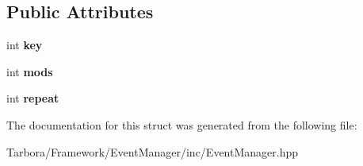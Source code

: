 \subsection*{Public Attributes}
\begin{DoxyCompactItemize}
\item 
\mbox{\label{structTarbora_1_1KeyPressEvent_a3cd905ede11abd9e8e3f0ab2aa06c334}} 
int {\bfseries key}
\item 
\mbox{\label{structTarbora_1_1KeyPressEvent_a62b84a96fe52053278f029ffb4720937}} 
int {\bfseries mods}
\item 
\mbox{\label{structTarbora_1_1KeyPressEvent_ad7887d04cbc6177e0f895dfb33d3dff1}} 
int {\bfseries repeat}
\end{DoxyCompactItemize}


The documentation for this struct was generated from the following file\+:\begin{DoxyCompactItemize}
\item 
Tarbora/\+Framework/\+Event\+Manager/inc/Event\+Manager.\+hpp\end{DoxyCompactItemize}

